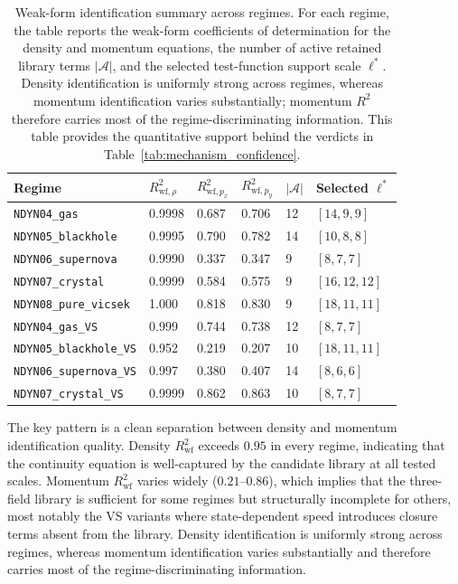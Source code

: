 \begin{table}[ht]
\centering
\caption{Weak-form identification summary across regimes.
For each regime, the table reports the weak-form coefficients of
determination for the density and momentum equations, the number of active
retained library terms $|\mathcal{A}|$, and the selected test-function
support scale $\boldsymbol{\ell}^*$.  Density identification is uniformly
strong across regimes, whereas momentum identification varies
substantially; momentum $R^2$ therefore carries most of the
regime-discriminating information.
This table provides the quantitative support behind the verdicts in
Table~\ref{tab:mechanism_confidence}.}
\label{tab:wsindy_regime_summary}
\renewcommand{\arraystretch}{0.95}
\small
\begin{tabular}{llllll}
\toprule
\textbf{Regime} & $R^2_{\text{wf},\rho}$ & $R^2_{\text{wf},p_x}$ & $R^2_{\text{wf},p_y}$ & $|\mathcal{A}|$ & Selected $\boldsymbol{\ell}^*$ \\
\midrule
\texttt{NDYN04\_gas} & 0.9998 & 0.687 & 0.706 & 12 & $[14,9,9]$ \\
\texttt{NDYN05\_blackhole} & 0.9995 & 0.790 & 0.782 & 14 & $[10,8,8]$ \\
\texttt{NDYN06\_supernova} & 0.9990 & 0.337 & 0.347 & 9 & $[8,7,7]$ \\
\texttt{NDYN07\_crystal} & 0.9999 & 0.584 & 0.575 & 9 & $[16,12,12]$ \\
\texttt{NDYN08\_pure\_vicsek} & 1.000 & 0.818 & 0.830 & 9 & $[18,11,11]$ \\
\midrule
\texttt{NDYN04\_gas\_VS} & 0.999 & 0.744 & 0.738 & 12 & $[8,7,7]$ \\
\texttt{NDYN05\_blackhole\_VS} & 0.952 & 0.219 & 0.207 & 10 & $[18,11,11]$ \\
\texttt{NDYN06\_supernova\_VS} & 0.997 & 0.380 & 0.407 & 14 & $[8,6,6]$ \\
\texttt{NDYN07\_crystal\_VS} & 0.9999 & 0.862 & 0.863 & 10 & $[8,7,7]$ \\
\bottomrule
\end{tabular}
\end{table}

\noindent
The key pattern is a clean separation between density and momentum
identification quality.  Density $R^2_{\text{wf}}$ exceeds $0.95$ in every
regime, indicating that the continuity equation is well-captured by the
candidate library at all tested scales.  Momentum $R^2_{\text{wf}}$ varies
widely ($0.21$--$0.86$), which implies that the three-field library is
sufficient for some regimes but structurally incomplete for others, most
notably the VS variants where state-dependent speed introduces closure
terms absent from the library.  Density identification is uniformly strong
across regimes, whereas momentum identification varies substantially and
therefore carries most of the regime-discriminating information.

